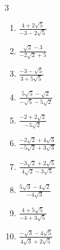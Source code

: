 \begin{multicols}{3}
\begin{enumerate}

\columnbreak %

  \item $\displaystyle \frac{4+2\sqrt{5}}{-3-2\sqrt{5}}$


  \item $\displaystyle \frac{\sqrt{2}-3}{-2\sqrt{2}+5}$


  \item $\displaystyle \frac{-3-\sqrt{5}}{3+5\sqrt{5}}$


  \item $\displaystyle \frac{5\sqrt{5}-\sqrt{2}}{-\sqrt{5}-5\sqrt{2}}$


  \item $\displaystyle \frac{-2+2\sqrt{2}}{-5\sqrt{2}}$


\columnbreak %

  \item $\displaystyle \frac{-2\sqrt{2}+4\sqrt{3}}{-5\sqrt{2}+3\sqrt{3}}$


  \item $\displaystyle \frac{-3\sqrt{2}+2\sqrt{5}}{4\sqrt{2}-3\sqrt{5}}$


  \item $\displaystyle \frac{5\sqrt{3}-4\sqrt{2}}{-4\sqrt{3}}$


  \item $\displaystyle \frac{4+5\sqrt{5}}{-4+3\sqrt{5}}$


  \item $\displaystyle \frac{-\sqrt{3}-4\sqrt{5}}{4\sqrt{3}+2\sqrt{5}}$



\end{enumerate}
\end{multicols}
